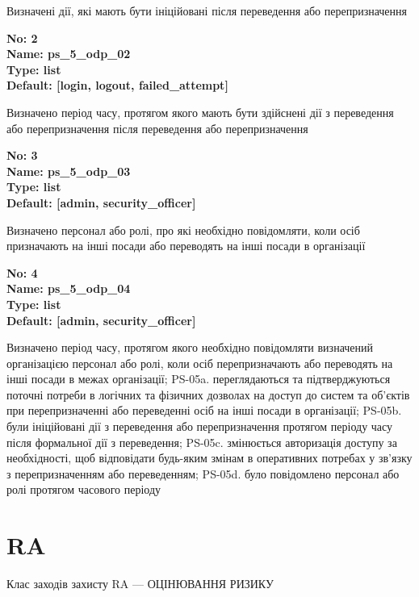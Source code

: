 \documentclass{article}
\begin{document}
{\footnotesize Визначені дії, які мають бути ініційовані після переведення або перепризначення}


{\footnotesize\bfseries
No: 2\\
Name: ps\_\allowbreak{}5\_\allowbreak{}odp\_\allowbreak{}02\\
Type: list\\
Default: [\textquotedbl{}login\textquotedbl{}, \textquotedbl{}logout\textquotedbl{}, \textquotedbl{}failed\_\allowbreak{}attempt\textquotedbl{}]
}

{\footnotesize Визначено період часу, протягом якого мають бути здійснені дії з переведення або перепризначення після переведення або перепризначення}


{\footnotesize\bfseries
No: 3\\
Name: ps\_\allowbreak{}5\_\allowbreak{}odp\_\allowbreak{}03\\
Type: list\\
Default: [\textquotedbl{}admin\textquotedbl{}, \textquotedbl{}security\_\allowbreak{}officer\textquotedbl{}]
}

{\footnotesize Визначено персонал або ролі, про які необхідно повідомляти, коли осіб призначають на інші посади або переводять на інші посади в організації}


{\footnotesize\bfseries
No: 4\\
Name: ps\_\allowbreak{}5\_\allowbreak{}odp\_\allowbreak{}04\\
Type: list\\
Default: [\textquotedbl{}admin\textquotedbl{}, \textquotedbl{}security\_\allowbreak{}officer\textquotedbl{}]
}

{\footnotesize Визначено період часу, протягом якого необхідно повідомляти визначений організацією персонал або ролі, коли осіб перепризначають або переводять на інші посади в межах організації; PS-05a. переглядаються та підтверджуються поточні потреби в логічних та фізичних дозволах на доступ до систем та об'єктів при перепризначенні або переведенні осіб на інші посади в організації; PS-05b. були ініційовані дії з переведення або перепризначення протягом періоду часу після формальної дії з переведення; PS-05c. змінюється авторизація доступу за необхідності, щоб відповідати будь-яким змінам в оперативних потребах у зв'язку з перепризначенням або переведенням; PS-05d. було повідомлено персонал або ролі протягом часового періоду}




\section{RA}
Клас заходів захисту RA --- ОЦІНЮВАННЯ РИЗИКУ
\end{document}
